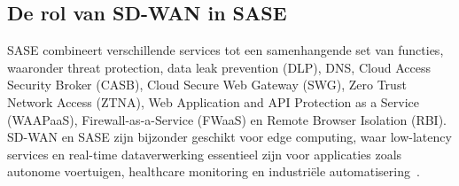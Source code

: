 \subsection{De rol van SD-WAN in SASE}
SASE combineert verschillende services tot een samenhangende set van functies, waaronder threat protection, data leak prevention (DLP), DNS, Cloud Access Security Broker (CASB), Cloud Secure Web Gateway (SWG), Zero Trust Network Access (ZTNA), Web Application and API Protection as a Service (WAAPaaS), Firewall-as-a-Service (FWaaS) en Remote Browser Isolation (RBI). SD-WAN en SASE zijn bijzonder geschikt voor edge computing, waar low-latency services en real-time dataverwerking essentieel zijn voor applicaties zoals autonome voertuigen, healthcare monitoring en industriële automatisering~\autocite{ijraset2025}.